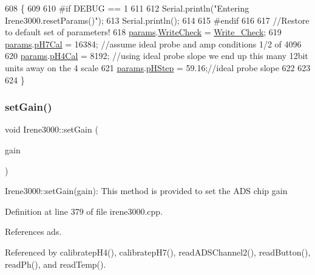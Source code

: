 \begin{DoxyCode}
608 \{
609 
610 \textcolor{preprocessor}{#if DEBUG == 1 }
611 
612     Serial.println(\textcolor{stringliteral}{"Entering Irene3000.resetParams()"});
613     Serial.println();
614 
615 \textcolor{preprocessor}{#endif }
616 
617     \textcolor{comment}{//Restore to default set of parameters!}
618     \hyperlink{classIrene3000_a136585a5ee7f9ac6ab52175fa153f8e3}{params}.\hyperlink{structIrene3000_1_1parameters__T_a56f1f14d33a69300d580eda2dc52cecd}{WriteCheck} = \hyperlink{Irene3000_8h_a9fa3b8fd890fde289060ee254cd273d5}{Write\_Check};
619     \hyperlink{classIrene3000_a136585a5ee7f9ac6ab52175fa153f8e3}{params}.\hyperlink{structIrene3000_1_1parameters__T_a21265466a570d84bff914f26d2f7a03e}{pH7Cal} = 16384; \textcolor{comment}{//assume ideal probe and amp conditions 1/2 of 4096}
620     \hyperlink{classIrene3000_a136585a5ee7f9ac6ab52175fa153f8e3}{params}.\hyperlink{structIrene3000_1_1parameters__T_a1144de6fb54eb3e1dd2a3d8c2afc97dc}{pH4Cal} = 8192; \textcolor{comment}{//using ideal probe slope we end up this many 12bit units away on the
       4 scale}
621     \hyperlink{classIrene3000_a136585a5ee7f9ac6ab52175fa153f8e3}{params}.\hyperlink{structIrene3000_1_1parameters__T_a61cfcc2539d5f630e9071f3753aba9fe}{pHStep} = 59.16;\textcolor{comment}{//ideal probe slope}
622 
623 
624 \}
\end{DoxyCode}
\mbox{\label{classIrene3000_aff7c5da186b388e7272e63ff88a20c34}} 
\subsubsection{\texorpdfstring{set\+Gain()}{setGain()}}
{\footnotesize\ttfamily void Irene3000\+::set\+Gain (\begin{DoxyParamCaption}\item[{ads\+Gain\+\_\+t}]{gain }\end{DoxyParamCaption})}

Irene3000\+::set\+Gain(gain)\+: This method is provided to set the A\+DS chip gain 

Definition at line 379 of file irene3000.\+cpp.



References ads.



Referenced by calibratep\+H4(), calibratep\+H7(), read\+A\+D\+S\+Channel2(), read\+Button(), read\+Ph(), and read\+Temp().


